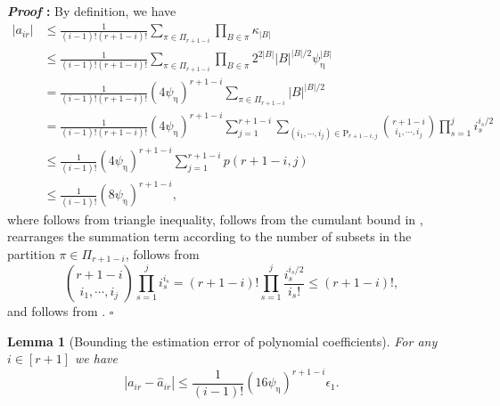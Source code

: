 \documentclass{article}
\def\eps{{\epsilon}}
\newtheorem{lemma}{Lemma}[section]
\renewenvironment{proof}{\noindent\textbf{\textit{Proof }:}}{\hfill$\square$}
\begin{document}
\begin{proof}
    By definition, we have
    \begin{align}
        |a_{ir}| &\leq \frac{1}{(i-1)!(r+1-i)!} \sum_{\pi\in\Pi_{r+1-i}} \prod_{B\in\pi} \kappa_{|B|} \label{eq:a-ik-bound-1} \\
        &\leq \frac{1}{(i-1)!(r+1-i)!} \sum_{\pi\in\Pi_{r+1-i}} \prod_{B\in\pi} 2^{2|B|}|B|^{|B|/2}\psi_{\upeta}^{|B|} \label{eq:a-ik-bound-2} \\
        &= \frac{1}{(i-1)!(r+1-i)!} (4\psi_{\upeta})^{r+1-i} \sum_{\pi\in\Pi_{r+1-i}} |B|^{|B|/2} \label{eq:a-ik-bound-3} \\
        &= \frac{1}{(i-1)!(r+1-i)!} (4\psi_{\upeta})^{r+1-i} \sum_{j=1}^{r+1-i} \sum_{(i_1,\cdots,i_j)\in\mathrm{P}_{r+1-i,j}} \binom{r+1-i}{i_1,\cdots,i_j} \prod_{s=1}^j i_s^{i_s/2} \label{eq:a-ik-bound-4} \\
        &\leq \frac{1}{(i-1)!} (4\psi_{\upeta})^{r+1-i} \sum_{j=1}^{r+1-i} p(r+1-i,j) \label{eq:a-ik-bound-5} \\
        &\leq \frac{1}{(i-1)!} (8\psi_{\upeta})^{r+1-i}, \label{eq:a-ik-bound-6}
    \end{align}
    where  follows from triangle inequality,  follows from the cumulant bound in ,  rearranges the summation term according to the number of subsets in the partition $\pi\in\Pi_{r+1-i}$,  follows from
    \[
    \binom{r+1-i}{i_1,\cdots,i_j}\prod_{s=1}^j i_s^{i_s} = (r+1-i)!\prod_{s=1}^j \frac{i_s^{i_s/2}}{i_s!} \leq (r+1-i)!,
    \]
    and  follows from .
\end{proof}

\begin{lemma}[Bounding the estimation error of polynomial coefficients]
    \label{lemma:hat-a-ik-error}
    For any $i\in[r+1]$ we have
    \begin{equation}
        \label{eq:hat-a-ik-error}
        |a_{ir}-\hat{a}_{ir}| \leq \frac{1}{(i-1)!} (16\psi_{\upeta})^{r+1-i}  \eps_1.
    \end{equation}
\end{lemma}
\end{document}

